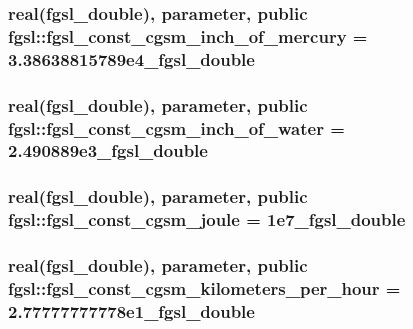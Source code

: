 \subsubsection[{fgsl\+\_\+const\+\_\+cgsm\+\_\+inch\+\_\+of\+\_\+mercury}]{\setlength{\rightskip}{0pt plus 5cm}real({\bf fgsl\+\_\+double}), parameter, public fgsl\+::fgsl\+\_\+const\+\_\+cgsm\+\_\+inch\+\_\+of\+\_\+mercury = 3.\+38638815789e4\+\_\+fgsl\+\_\+double}\label{namespacefgsl_a3cedc29e68dc7bfeb7a43c07d1496c6e}
\hypertarget{namespacefgsl_ae3e9d91a0883033afa45f2237810a306}{}
\subsubsection[{fgsl\+\_\+const\+\_\+cgsm\+\_\+inch\+\_\+of\+\_\+water}]{\setlength{\rightskip}{0pt plus 5cm}real({\bf fgsl\+\_\+double}), parameter, public fgsl\+::fgsl\+\_\+const\+\_\+cgsm\+\_\+inch\+\_\+of\+\_\+water = 2.\+490889e3\+\_\+fgsl\+\_\+double}\label{namespacefgsl_ae3e9d91a0883033afa45f2237810a306}
\hypertarget{namespacefgsl_adea52d494e1c4e17f003736bd07eb592}{}
\subsubsection[{fgsl\+\_\+const\+\_\+cgsm\+\_\+joule}]{\setlength{\rightskip}{0pt plus 5cm}real({\bf fgsl\+\_\+double}), parameter, public fgsl\+::fgsl\+\_\+const\+\_\+cgsm\+\_\+joule = 1e7\+\_\+fgsl\+\_\+double}\label{namespacefgsl_adea52d494e1c4e17f003736bd07eb592}
\hypertarget{namespacefgsl_a302d497108c596ed552f90c728af3002}{}
\subsubsection[{fgsl\+\_\+const\+\_\+cgsm\+\_\+kilometers\+\_\+per\+\_\+hour}]{\setlength{\rightskip}{0pt plus 5cm}real({\bf fgsl\+\_\+double}), parameter, public fgsl\+::fgsl\+\_\+const\+\_\+cgsm\+\_\+kilometers\+\_\+per\+\_\+hour = 2.\+77777777778e1\+\_\+fgsl\+\_\+double}\label{namespacefgsl_a302d497108c596ed552f90c728af3002}
\hypertarget{namespacefgsl_aca0248b47e63c840ed0ab430927008f1}{}
